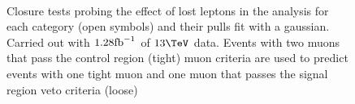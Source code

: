\begin{figure}[h!]
  \begin{center}
    ~~
    \caption{Closure tests probing the effect of lost leptons in the
    analysis for each
    \njet category (open symbols) and their pulls fit with a gaussian. Carried out with $1.28\text{fb}^{-1}$ of
      $13\tev$ data. Events with two muons that pass the control
      region (tight) muon criteria are used to predict events with one
      tight muon and one muon that passes the signal region veto
      criteria (loose)}
    \label{fig:closureLooseLep}
  \end{center} 
\end{figure}




